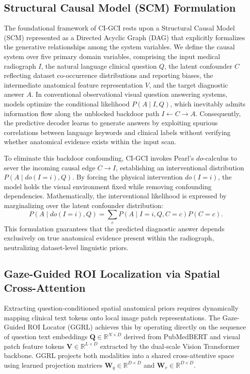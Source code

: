 \documentclass[journal,twoside,web]{ieeecolor}
\begin{document}
\subsection{Structural Causal Model (SCM) Formulation}
The foundational framework of CI-GCI rests upon a Structural Causal Model (SCM) represented as a Directed Acyclic Graph (DAG) that explicitly formalizes the generative relationships among the system variables. We define the causal system over five primary domain variables, comprising the input medical radiograph $I$, the natural language clinical question $Q$, the latent confounder $C$ reflecting dataset co-occurrence distributions and reporting biases, the intermediate anatomical feature representation $V$, and the target diagnostic answer $A$. In conventional observational visual question answering systems, models optimize the conditional likelihood $P(A \mid I, Q)$, which inevitably admits information flow along the unblocked backdoor path $I \leftarrow C \rightarrow A$. Consequently, the predictive decoder learns to generate answers by exploiting spurious correlations between language keywords and clinical labels without verifying whether anatomical evidence exists within the input scan.

To eliminate this backdoor confounding, CI-GCI invokes Pearl's $do$-calculus to sever the incoming causal edge $C \rightarrow I$, establishing an interventional distribution $P(A \mid do(I=i), Q)$. By forcing the physical intervention $do(I=i)$, the model holds the visual environment fixed while removing confounding dependencies. Mathematically, the interventional likelihood is expressed by marginalizing over the latent confounder distribution:
\begin{equation}
P(A \mid do(I=i), Q) = \sum_{c} P(A \mid I=i, Q, C=c) P(C=c).
\label{eq:scm_do}
\end{equation}
This formulation guarantees that the predicted diagnostic answer depends exclusively on true anatomical evidence present within the radiograph, neutralizing dataset-level linguistic priors.

\subsection{Gaze-Guided ROI Localization via Spatial Cross-Attention}
Extracting question-conditioned spatial anatomical priors requires dynamically mapping clinical text tokens onto local image patch representations. The Gaze-Guided ROI Locator (GGRL) achieves this by operating directly on the sequence of question text embeddings $\mathbf{Q} \in \mathbb{R}^{N \times D}$ derived from PubMedBERT and visual patch feature tokens $\mathbf{V} \in \mathbb{R}^{L \times D}$ extracted by the dual-scale Vision Transformer backbone. GGRL projects both modalities into a shared cross-attentive space using learned projection matrices $\mathbf{W}_q \in \mathbb{R}^{D \times D}$ and $\mathbf{W}_v \in \mathbb{R}^{D \times D}$.
\end{document}
